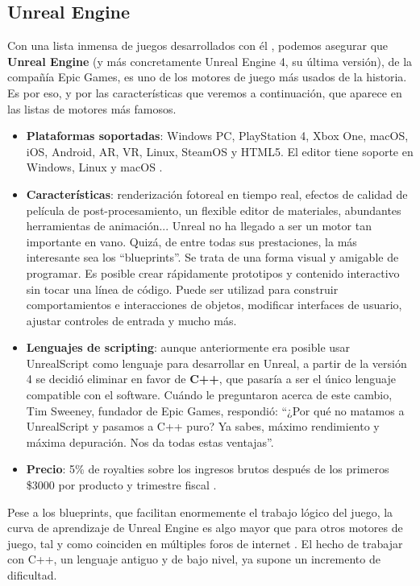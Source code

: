 \subsection{Unreal Engine}
Con una lista inmensa de juegos desarrollados con él \cite{wiki:unrealgames}, podemos asegurar que \textbf{Unreal Engine} (y más concretamente Unreal Engine 4, su última versión), de la compañía Epic Games, es uno de los motores de juego más usados de la historia. Es por eso, y por las características que veremos a continuación, que aparece en las listas de motores más famosos.
\begin{itemize}
\item \textbf{Plataformas soportadas}: Windows PC, PlayStation 4, Xbox One, macOS, iOS, Android, AR, VR, Linux, SteamOS y HTML5. El editor tiene soporte en Windows, Linux y macOS \cite{eulaunreal}.
\item \textbf{Características}: renderización fotoreal en tiempo real, efectos de calidad de película de post-procesamiento, un flexible editor de materiales, abundantes herramientas de animación...\cite{unrealfeatures} Unreal no ha llegado a ser un motor tan importante en vano. Quizá, de entre todas sus prestaciones, la más interesante sea los ``blueprints''. Se trata de una forma visual y amigable de programar. Es posible crear rápidamente prototipos y contenido interactivo sin tocar una línea de código. Puede ser utilizad para construir comportamientos e interacciones de objetos, modificar interfaces de usuario, ajustar controles de entrada y mucho más.
\item \textbf{Lenguajes de scripting}: aunque anteriormente era posible usar UnrealScript como lenguaje para desarrollar en Unreal, a partir de la versión 4 se decidió eliminar en favor de \textbf{C++}, que pasaría a ser el único lenguaje compatible con el software. Cuándo le preguntaron acerca de este cambio, Tim Sweeney, fundador de Epic Games, respondió: ``¿Por qué no matamos a UnrealScript y pasamos a C++ puro? Ya sabes, máximo rendimiento y máxima depuración. Nos da todas estas ventajas''\cite{removeuscript}.
\item \textbf{Precio}: 5\% de royalties sobre los ingresos brutos después de los primeros \$3000 por producto y trimestre fiscal \cite{eulaunreal}.
\end{itemize}

Pese a los blueprints, que facilitan enormemente el trabajo lógico del juego, la curva de aprendizaje de Unreal Engine es algo mayor que para otros motores de juego, tal y como coinciden en múltiples foros de internet \cite{curveunreal}. El hecho de trabajar con C++, un lenguaje antiguo y de bajo nivel, ya supone un incremento de dificultad.


